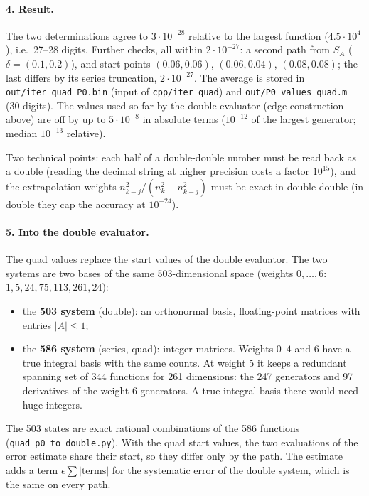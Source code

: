 \documentclass[11pt]{article}
\begin{document}
\paragraph{4. Result.}
The two determinations agree to $3\cdot10^{-28}$ relative to the largest function ($4.5\cdot10^4$), i.e.\ 27--28 digits.
Further checks, all within $2\cdot10^{-27}$: a second path from $S_A$ ($\delta=(0.1,0.2)$), and start points $(0.06,0.06)$,
$(0.06,0.04)$, $(0.08,0.08)$; the last differs by its series truncation, $2\cdot10^{-27}$. The average is stored in
\texttt{out/iter\_quad\_P0.bin} (input of \texttt{cpp/iter\_quad}) and \texttt{out/P0\_values\_quad.m} (30 digits). The values
used so far by the double evaluator (edge construction above) are off by up to $5\cdot10^{-8}$ in absolute terms
($10^{-12}$ of the largest generator; median $10^{-13}$ relative).

Two technical points: each half of a double-double number must be read back as a double (reading the decimal
string at higher precision costs a factor $10^{15}$), and the extrapolation weights $n_{k-j}^2/(n_k^2-n_{k-j}^2)$ must
be exact in double-double (in double they cap the accuracy at $10^{-24}$).

\paragraph{5. Into the double evaluator.} The quad values replace the start values of the double evaluator. The two
systems are two bases of the same 503-dimensional space (weights $0,\dots,6$: $1, 5, 24, 75, 113, 261, 24$):
\begin{itemize}
\item the \textbf{503 system} (double): an orthonormal basis, floating-point matrices with entries $|A|\le1$;
\item the \textbf{586 system} (series, quad): integer matrices. Weights $0$--$4$ and $6$ have a true integral basis with the
  same counts. At weight 5 it keeps a redundant spanning set of 344 functions for 261 dimensions: the 247 generators
  and 97 derivatives of the weight-6 generators. A true integral basis there would need huge integers.
\end{itemize}
The 503 states are exact rational combinations of the 586 functions (\texttt{quad\_p0\_to\_double.py}). With the quad
start values, the two evaluations of the error estimate share their start, so they differ only by the path. The
estimate adds a term $\epsilon\sum|\text{terms}|$ for the systematic error of the double system, which is the same on
every path.
\end{document}
